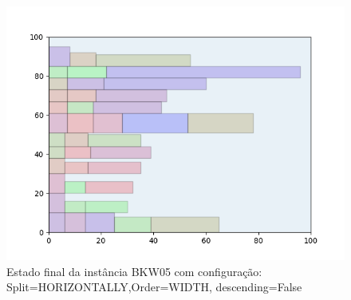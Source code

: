 \begin{figure}[H]
    \centering
    \caption[]{Estado final da instância BKW05 com configuração: Split=HORIZONTALLY,Order=WIDTH, descending=False}
    \label{fig:bkw05-horizontally-width-false}
    \includegraphics[scale=0.5]{output/figures/bkw/bkw05/horizontally/width/false/00}
\end{figure}